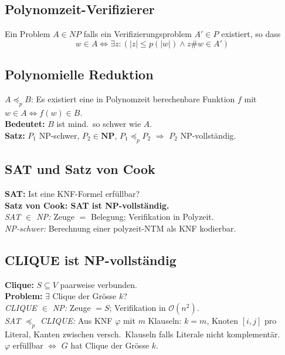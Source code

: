 \subsection{Polynomzeit-Verifizierer}
Ein Problem $A \in NP$ falls ein Verifizierungsproblem $A' \in P$ existiert, so dass 
$$ w \in A \Leftrightarrow \exists z: (|z| \leq p(|w|) \land z\#w \in A')$$

\subsection{Polynomielle Reduktion}
$A \preceq_p B$: Es existiert eine in Polynomzeit berechenbare Funktion $f$ mit $w \in A \Leftrightarrow f(w) \in B$.\\

\textbf{Bedeutet:} $B$ ist mind.\ so schwer wie $A$.\\
\textbf{Satz:} $P_1$ NP-schwer, $P_2 \in \mathbf{NP}$, $P_1 \preceq_p P_2$ $\Rightarrow$ $P_2$ NP-vollständig.



\subsection{SAT und Satz von Cook}
\textbf{SAT:} Ist eine KNF-Formel erfüllbar?\\
\textbf{Satz von Cook: SAT ist NP-vollständig.}\\
\textit{SAT $\in$ NP:} Zeuge $= $ Belegung; Verifikation in Polyzeit.\\
\textit{NP-schwer:} Berechnung einer polyzeit-NTM als KNF kodierbar.

\subsection{CLIQUE ist NP-vollständig}
\textbf{Clique:} $S \subseteq V$ paarweise verbunden. \\
\textbf{Problem:} $\exists$ Clique der Grösse $k$?\\
\textit{CLIQUE $\in$ NP:} Zeuge $= S$; Verifikation in $\mathcal{O}(n^2)$.\\
\textit{SAT $\preceq_p$ CLIQUE:} Aus KNF $\varphi$ mit $m$ Klauseln: $k = m$, Knoten $[i,j]$ pro Literal, Kanten zwischen versch.\ Klauseln falls Literale nicht komplementär.\\
$\varphi$ erfüllbar $\Leftrightarrow$ $G$ hat Clique der Grösse $k$.

